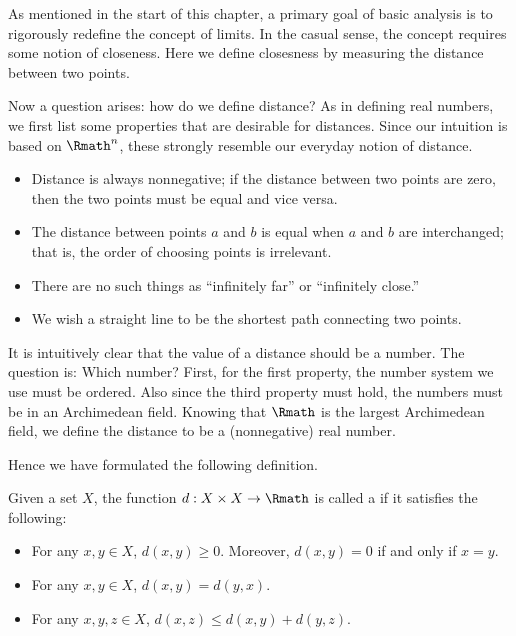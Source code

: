  \label{sec:metric}

As mentioned in the start of this chapter,
a primary goal of basic analysis
is to rigorously redefine the concept of limits.
In the casual sense,
the concept requires some notion of closeness.
Here we define closesness by measuring the distance between two points.

Now a question arises:
how do we define distance?
As in defining real numbers,
we first list some properties that are desirable for distances.
Since our intuition is based on \(\Rmath^n\),
these strongly resemble our everyday notion of distance.

\begin{itemize}
    \item Distance is always nonnegative;
    if the distance between two points are zero,
    then the two points must be equal and vice versa.
    
    \item The distance between points \(a\) and \(b\)
    is equal when \(a\) and \(b\) are interchanged;
    that is,
    the order of choosing points is irrelevant.
    
    \item There are no such things
    as ``infinitely far'' or ``infinitely close.''
    
    \item We wish a straight line to be the shortest path
    connecting two points.
\end{itemize}

It is intuitively clear that
the value of a distance should be a number.
The question is: Which number?
First, for the first property,
the number system we use must be ordered.
Also since the third property must hold,
the numbers must be in an Archimedean field.
Knowing that \(\Rmath\) is the largest Archimedean field,
we define the distance to be a (nonnegative) real number.

Hence we have formulated the following definition.

\begin{definition}
    \label{def:metric}
    Given a set \(X\),
    the function \(d:X\times X\to\Rmath\) is called
    a 
    if it satisfies the following:
    \begin{itemize}
        \item For any \(x,y\in X\), \(d(x,y)\ge 0\).
        Moreover, \(d(x,y)=0\) if and only if \(x=y\).

        \item For any \(x,y\in X\), \(d(x,y)=d(y,x)\).
        
        \item For any \(x,y,z\in X\), \(d(x,z)\le d(x,y)+d(y,z)\).
    \end{itemize}
\end{definition}